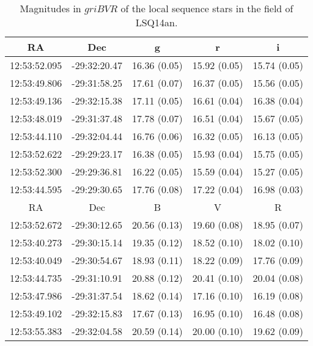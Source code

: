 \documentclass[useAMS,usenatbib]{mn2e}
\def\an{LSQ14an}
\begin{document}
\begin{table*}
\caption{Magnitudes in $griBVR$ of the local sequence stars in the field of \an.}
\begin{center}
\begin{tabular}{ccccc}
\hline
RA& Dec & g	&	r	&	i\\
\hline
12:53:52.095  &	-29:32:20.47	& 16.36	(0.05) & 	15.92	(0.05) &	15.74	(0.05)\\
12:53:49.806  &	-29:31:58.25	& 17.61	(0.07) & 	16.37	(0.05) &	15.56	(0.05)\\
12:53:49.136  &	-29:32:15.38	& 17.11	(0.05) & 	16.61	(0.04) &	16.38	(0.04)\\
12:53:48.019  &	-29:31:37.48	& 17.78	(0.07) & 	16.51	(0.04) &	15.67	(0.05)\\	
12:53:44.110  &		-29:32:04.44	& 16.76	(0.06) & 	16.32	(0.05) &	16.13	(0.05)\\
12:53:52.622  &	-29:29:23.17	& 16.38	(0.05) & 	15.93	(0.04) &	15.75	(0.05)\\
12:53:52.300  &	-29:29:36.81	& 16.22	(0.05) & 	15.59	(0.04) &	15.27	(0.05)\\
12:53:44.595  &	-29:29:30.65	& 17.76	(0.08) & 	17.22	(0.04) &	16.98	(0.03)\\
\hline
RA& Dec & B	&	V	&	R\\
\hline
12:53:52.672 &	-29:30:12.65 &	20.56	(0.13) &	19.60	(0.08) &	18.95	(0.07)	\\
12:53:40.273 &	-29:30:15.14 &	19.35	(0.12) &	18.52	(0.10) &	18.02	(0.10)	\\
12:53:40.049 &	-29:30:54.67 &	18.93	(0.11) &	18.22	(0.09) &	17.76	(0.09)	\\
12:53:44.735 &	-29:31:10.91 &	20.88	(0.12) &	20.41	(0.10) &	20.04	(0.08)	\\
12:53:47.986 &	-29:31:37.54 &	18.62	(0.14) &	17.16	(0.10) &	16.19	(0.08)	\\
12:53:49.102 &	-29:32:15.83 &	17.67	(0.13) &	16.95	(0.10) &	16.48	(0.08)	\\
12:53:55.383 &	-29:32:04.58 &	20.59	(0.14) &	20.00	(0.10) &	19.62	(0.09)	\\
\hline
\end{tabular}
\end{center}
\label{table:sref}
\end{table*}%
\end{document}
